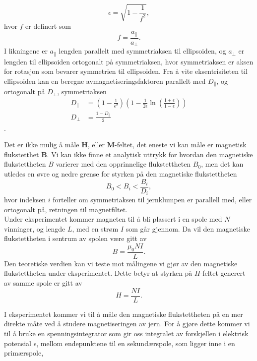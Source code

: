 \documentclass[%
 reprint,
nofootinbib,
aps,
]{revtex4-1}
\begin{document}
\begin{equation}
  \epsilon = \sqrt{1-\frac{1}{f^2}},\label{eksent}
\end{equation}
hvor $f$ er definert som
\begin{equation*}
  f = \frac{a_{\parallel}}{a_{\perp}}.
\end{equation*}
I likningene er $a_{\parallel}$ lengden parallelt med symmetriaksen til ellipsoiden, og $a_{\perp}$ er lengden til ellipsoiden ortogonalt på symmetriaksen, hvor symmetriaksen er aksen for rotasjon som bevarer symmetrien til ellipsoiden. Fra å vite eksentrisiteten til ellipsoiden kan en beregne avmagnetiseringsfaktoren parallelt med $D_{\parallel}$, og ortogonalt på $D_{\perp}$, symmetriaksen
\begin{align*}
  D_{\parallel} &= \left(1-\frac{1}{\epsilon^2}\right)\left(1-\frac{1}{2\epsilon}\ln{\left(\frac{1+\epsilon}{1-\epsilon}\right)} \right) \\
  D_{\perp} &= \frac{1-D_{\parallel}}{2}
\end{align*}.
\par
Det er ikke mulig å måle $\bm{H}$, eller $\bm{M}$-feltet, det eneste vi kan måle er magnetisk flukstetthet $\bm{B}$. Vi kan ikke finne et analytisk uttrykk for hvordan den magnetiske flukstettheten $B$ varierer med den opprinnelige flukstettheten $B_0$, men det kan utledes en øvre og nedre grense for styrken på den magnetiske flukstettheten
\begin{equation}
  B_0 < B_i < \frac{B_i}{D_i}, \label{upper_limit}
\end{equation}
hvor indeksen $i$ forteller om symmetriaksen til jernklumpen er parallell med, eller ortogonalt på, retningen til magnetfiltet.
\\Under eksperimentet kommer magneten til å bli plassert i en spole med $N$ vinninger, og lengde $L$, med en strøm $I$ som går gjennom. Da vil den magnetiske flukstettheten i sentrum av spolen være gitt av
\begin{equation}
  B = \frac{\mu_0NI}{L}. \label{nice_b}
\end{equation}Den teoretiske verdien kan vi teste mot målingene vi gjør av den magnetiske flukstettheten under eksperimentet. Dette betyr at styrken på $H$-feltet generert av samme spole er gitt av
\begin{equation}
  H = \frac{NI}{L}. \label{nice_H}
\end{equation}
\par
I eksperimentet kommer vi til å måle den magnetiske flukstettheten på en mer direkte måte ved å studere magnetiseringen av jern. For å gjøre dette kommer vi til å bruke en spenningsintegrator som gir oss integralet av forskjellen i elektrisk potensial $\epsilon$, mellom endepunktene til en sekundærspole, som ligger inne i en primærspole,
\end{document}
